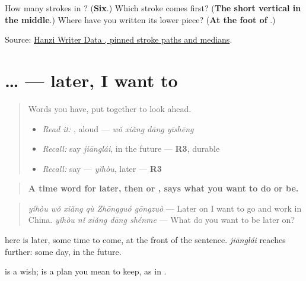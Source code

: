 \begin{tcolorbox}[breakable,colback=teal!4,colframe=teal!35!black,title={Before you move on}]
How many strokes in ? (\textbf{Six}.) Which stroke comes first? (\textbf{The short vertical in the middle}.) Where have you written its lower piece? (\textbf{At the foot of }.)

Source: \href{https://raw.githubusercontent.com/chanind/hanzi-writer-data/68d10a4b21150cae5e1ebbd223eed289cf32d90c/data/\%E5\%BD\%93.json}{Hanzi Writer Data , pinned stroke paths and medians}.
\end{tcolorbox}
\section[\texorpdfstring{\zh{以后我想}… (yǐhòu wǒ xiǎng …)}{以后我想… (yǐhòu wǒ xiǎng …)}]{… — later, I want to}

\label{lesson:ZH-C287-ambition}



\begin{quote}
Words you have, put together to look ahead.

\begin{itemize}
\raggedright
  \item \emph{Read it:} , aloud — \emph{wǒ xiǎng dāng yīshēng}
  \item \emph{Recall:} say \emph{jiānglái}, in the future — \textbf{R3}, durable
  \item \emph{Recall:} say  — \emph{yǐhòu}, later — \textbf{R3}
\end{itemize}
\end{quote}

\begin{grammarlens}[title={Grammar Lens: \zh{以后} and \zh{想}, looking ahead}]
\begin{quote}
\textbf{A time word for later, then  or , says what you want to do or be.}
\end{quote}

\begin{quote}
\textbf{} \emph{yǐhòu wǒ xiǎng qù Zhōngguó gōngzuò} — Later on I want to go and work in China. \textbf{} \emph{yǐhòu nǐ xiǎng dāng shénme} — What do you want to be later on?
\end{quote}

 here is later, some time to come, at the front of the sentence. \emph{jiānglái} reaches further: some day, in the future.

 is a wish;  is a plan you mean to keep, as in .
\end{grammarlens}

